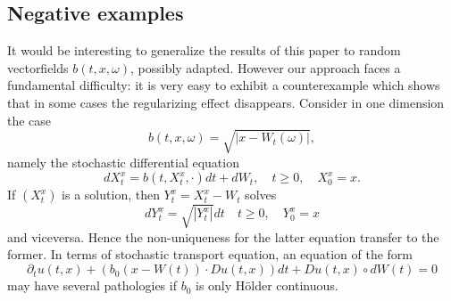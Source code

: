 \documentclass[a4paper,11pt]{article}
\begin{document}
\subsection{Negative examples}

It would be interesting to generalize the results of this paper to random
vectorfields $b(t, x,\omega)$, possibly adapted. However our approach faces
a fundamental difficulty: it is very easy to exhibit a counterexample which
shows that in some cases the regularizing effect disappears. Consider in one
dimension the case
\begin{equation*}
b\left(t, x,\omega\right) =\sqrt{\left| x-W_{t}\left( \omega\right) \right| }%
,
\end{equation*}
namely the stochastic differential equation
\begin{equation*}
dX_{t}^{x}=b(t, X_{t}^{x},\cdot ) dt+dW_{t},\quad t\geq0,\quad X_{0}^{x}=x .
\end{equation*}
If $\left( X_{t}^{x}\right) $ is a solution, then $Y_{t}^{x}=X_{t}^{x}-W_{t}$
solves
\begin{equation*}
dY_{t}^{x}=\sqrt{\left| Y_{t}^{x}\right| }dt\quad t\geq0,\quad Y_{0}^{x}=x
\end{equation*}
and viceversa. Hence the non-uniqueness for the latter equation transfer to
the former. In terms of stochastic transport equation, an equation of the
form
\begin{equation*}
\partial_{t}u\left( t,x\right) +\left( b_{0}\left( x-W\left( t\right)
\right) \cdot D u\left( t,x\right) \right) dt+D u\left( t,x\right) \circ
dW\left( t\right) =0
\end{equation*}
may have several pathologies if $b_{0}$ is only H\"{o}lder continuous.
\end{document}
